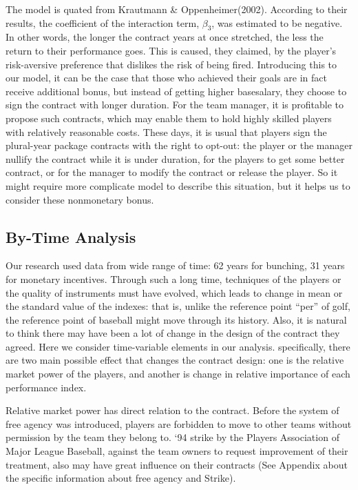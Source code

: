 \documentclass[dvipdfmx, 12pt]{article}
\begin{document}
The model is quated from Krautmann \& Oppenheimer(2002). According to their results, the coefficient of the interaction term, $\beta_3$, was estimated to be negative. In other words, the longer the contract years at once stretched, the less the return to their performance goes. This is caused, they claimed, by the player's risk-aversive preference that dislikes the risk of being fired. Introducing this to our model, it can be the case that those who achieved their goals are in fact receive additional bonus, but instead of getting higher basesalary, they choose to sign the contract with longer duration. For the team manager, it is profitable to propose such contracts, which may enable them to hold highly skilled players with relatively reasonable costs. These days, it is usual that players sign the plural-year package contracts with the right to opt-out: the player or the manager nullify the contract while it is under duration, for the players to get some better contract, or for the manager to modify the contract or release the player. So it might require more complicate model to describe this situation, but it helps us to consider these nonmonetary bonus.

\subsection{By-Time Analysis}

Our research used data from wide range of time: 62 years for bunching, 31 years for monetary incentives. Through such a long time, techniques of the players or the quality of instruments must have evolved, which leads to change in mean or the standard value of the indexes: that is, unlike the reference point ``per'' of golf, the reference point of baseball might move through its history. Also, it is natural to think there may have been a lot of change in the design of the contract they agreed. Here we consider time-variable elements in our analysis. specifically, there are two main possible effect that changes the contract design: one is the relative market power of the players, and another is change in relative importance of each performance index.

Relative market power has direct relation to the contract. Before the system of free agency was introduced, players are forbidden to move to other teams without permission by the team they belong to. `94 strike by the Players Association of Major League Baseball, against the team owners to request improvement of their treatment, also may have great influence on their contracts (See Appendix about the specific information about free agency and Strike).
\end{document}
